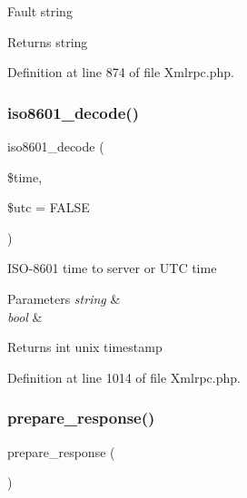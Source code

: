 Fault string

\begin{DoxyReturn}{Returns}
string 
\end{DoxyReturn}


Definition at line 874 of file Xmlrpc.\+php.

\mbox{\label{class_x_m_l___r_p_c___response_afd1f70f703eb82303e1199e8653c9c44}} 
\subsubsection{\texorpdfstring{iso8601\_decode()}{iso8601\_decode()}}
{\footnotesize\ttfamily iso8601\+\_\+decode (\begin{DoxyParamCaption}\item[{}]{\$time,  }\item[{}]{\$utc = {\ttfamily FALSE} }\end{DoxyParamCaption})}

I\+S\+O-\/8601 time to server or U\+TC time


\begin{DoxyParams}{Parameters}
{\em string} & \\
\hline
{\em bool} & \\
\hline
\end{DoxyParams}
\begin{DoxyReturn}{Returns}
int unix timestamp 
\end{DoxyReturn}


Definition at line 1014 of file Xmlrpc.\+php.

\mbox{\label{class_x_m_l___r_p_c___response_ac6925a06291928e6d4e8e53ea10fb1e2}} 
\subsubsection{\texorpdfstring{prepare\_response()}{prepare\_response()}}
{\footnotesize\ttfamily prepare\+\_\+response (\begin{DoxyParamCaption}{ }\end{DoxyParamCaption})}

